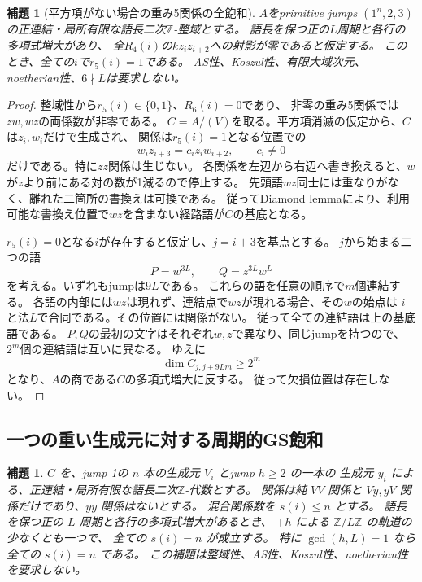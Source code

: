 \documentclass[11pt,a4paper]{ltjsarticle}
\newtheorem{lemma}[theorem]{補題}
\theoremstyle{definition}
\begin{document}
\begin{lemma}[平方項がない場合の重み5関係の全飽和]
\label{nozz:lem:full-r5}
$A$をprimitive jumps $(1^n,2,3)$の正連結・局所有限な語長二次$\mathbb Z$-整域とする。
語長を保つ正の$L$周期と各行の多項式増大があり、
全$R_4(i)$の$kz_i z_{i+2}$への射影が零であると仮定する。
このとき、全ての$i$で$r_5(i)=1$である。
AS性、Koszul性、有限大域次元、noetherian性、$6\nmid L$は要求しない。
\end{lemma}
\begin{proof}
整域性から$r_5(i)\in\{0,1\}$、$R_6(i)=0$であり、
非零の重み5関係では$zw,wz$の両係数が非零である。
$C=A/(V)$を取る。平方項消滅の仮定から、$C$は$z_i,w_i$だけで生成され、
関係は$r_5(i)=1$となる位置での
\[
w_i z_{i+3}=c_i z_i w_{i+2},\qquad c_i\ne0
\]
だけである。特に$zz$関係は生じない。
各関係を左辺から右辺へ書き換えると、$w$が$z$より前にある対の数が1減るので停止する。
先頭語$wz$同士には重なりがなく、離れた二箇所の書換えは可換である。
従ってDiamond lemmaにより、利用可能な書換え位置で$wz$を含まない経路語が$C$の基底となる。

$r_5(i)=0$となる$i$が存在すると仮定し、$j=i+3$を基点とする。
$j$から始まる二つの語
\[
P=w^{3L},\qquad Q=z^{3L}w^L
\]
を考える。いずれもjumpは$9L$である。
これらの語を任意の順序で$m$個連結する。
各語の内部には$wz$は現れず、連結点で$wz$が現れる場合、その$w$の始点は
$i$と法$L$で合同である。その位置には関係がない。
従って全ての連結語は上の基底語である。
$P,Q$の最初の文字はそれぞれ$w,z$で異なり、同じjumpを持つので、
$2^m$個の連結語は互いに異なる。
ゆえに
\[
\dim C_{j,j+9Lm}\ge2^m
\]
となり、$A$の商である$C$の多項式増大に反する。
従って欠損位置は存在しない。
\end{proof}

\subsection{一つの重い生成元に対する周期的GS飽和}

\begin{lemma}\label{nozz:lem:one-heavy-gs}
$C$ を、jump 1の $n$ 本の生成元 $V_i$ とjump $h\ge2$ の一本の
生成元 $y_i$ による、正連結・局所有限な語長二次$\mathbb Z$-代数とする。
関係は純 $VV$ 関係と $Vy,yV$ 関係だけであり、$yy$ 関係はないとする。
混合関係数を $s(i)\le n$ とする。
語長を保つ正の $L$ 周期と各行の多項式増大があるとき、
$+h$ による $\mathbb Z/L\mathbb Z$ の軌道の少なくとも一つで、
全ての $s(i)=n$ が成立する。
特に $\gcd(h,L)=1$ なら全ての $s(i)=n$ である。
この補題は整域性、AS性、Koszul性、noetherian性を要求しない。
\end{lemma}
\end{document}
